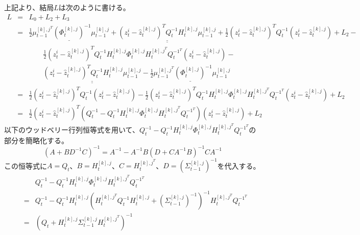 \documentclass[dvipdfmx,a4paper]{jsarticle}
\begin{document}
上記より、結局$L$は次のように書ける。
\begin{eqnarray}
	L &=& L_0 + L_2 + L_3 \nonumber \\
	&=& \underline{\frac{1}{2} \mu_{t - 1}^{{[k], j}^T} \left( \Phi_t^{[k], j} \right)^{-1} \mu_{t - 1}^{[k], j}} + \underline{\underline{\left( z_t^i - \widehat{z}_t^{[k], j} \right)^T Q_t^{-1} H_t^{[k], j} \mu_{t - 1}^{[k], j}}} + \frac{1}{2} \left( z_t^i - \widehat{z}_t^{[k], j} \right)^T Q_t^{-1} \left( z_t^i - \widehat{z}_t^{[k], j} \right) + L_2 - \nonumber \\
	&& \qquad \frac{1}{2} \left( z_t^i - \widehat{z}_t^{[k], j} \right)^T Q_t^{-1} H_t^{[k], j} \Phi_t^{[k], j} H_t^{{[k], j}^T} Q_t^{{-1}^T} \left( z_t^i - \widehat{z}_t^{[k], j} \right) - \nonumber \\
	&& \qquad \underline{\underline{\left( z_t^i - \widehat{z}_t^{[k], j} \right)^T Q_t^{-1} H_t^{[k], j} \mu_{t - 1}^{[k], j}}} - \underline{\frac{1}{2} \mu_{t - 1}^{{[k], j}^T} \left( \Phi_t^{[k], j} \right)^{-1} \mu_{t - 1}^{[k], j}} \nonumber \\
	&=& \frac{1}{2} \left( z_t^i - \widehat{z}_t^{[k], j} \right)^T Q_t^{-1} \left( z_t^i - \widehat{z}_t^{[k], j} \right) - \frac{1}{2} \left( z_t^i - \widehat{z}_t^{[k], j} \right)^T Q_t^{-1} H_t^{[k], j} \Phi_t^{[k], j} H_t^{{[k], j}^T} Q_t^{{-1}^T} \left( z_t^i - \widehat{z}_t^{[k], j} \right) + L_2 \nonumber \\
	&=& \frac{1}{2} \left( z_t^i - \widehat{z}_t^{[k], j} \right)^T \left( Q_t^{-1} - Q_t^{-1} H_t^{[k], j} \Phi_t^{[k], j} H_t^{{[k], j}^T} Q_t^{{-1}^T} \right) \left( z_t^i - \widehat{z}_t^{[k], j} \right) + L_2 \nonumber
\end{eqnarray}
以下のウッドベリー行列恒等式を用いて、$Q_t^{-1} - Q_t^{-1} H_t^{[k], j} \Phi_t^{[k], j} H_t^{{[k], j}^T} Q_t^{{-1}^T}$の部分を簡略化する。
\begin{equation}
	\left( A + B D^{-1} C \right)^{-1} = A^{-1} - A^{-1} B \left( D + C A^{-1} B \right)^{-1} C A^{-1}
\end{equation}
この恒等式に$A = Q_t$、$B = H_t^{[k], j}$、$C = H_t^{{[k], j}^T}$、$D = \left( \Sigma_{t - 1}^{[k], j} \right)^{-1}$を代入する。
\begin{eqnarray}
	&& Q_t^{-1} - Q_t^{-1} H_t^{[k], j} \Phi_t^{[k], j} H_t^{{[k], j}^T} Q_t^{{-1}^T} \nonumber \\
	&=& Q_t^{-1} - Q_t^{-1} H_t^{[k], j} \left( H_t^{{[k], j}^T} Q_t^{-1} H_t^{[k], j} + \left( \Sigma_{t - 1}^{[k], j} \right)^{-1} \right)^{-1} H_t^{{[k], j}^T} Q_t^{{-1}^T} \nonumber \\
	&=& \left( Q_t + H_t^{[k], j} \Sigma_{t - 1}^{[k], j} H_t^{{[k], j}^T} \right)^{-1} \nonumber
\end{eqnarray}
\end{document}
